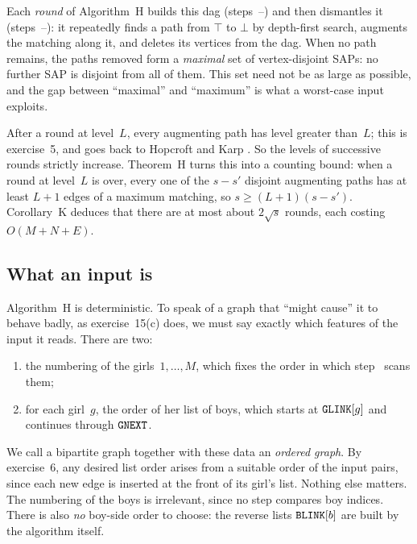 Each \emph{round} of Algorithm~H builds this dag (steps~--)
and then dismantles it (steps~--): it repeatedly finds a
path from $\top$ to $\bot$ by depth-first search, augments the matching
along it, and deletes its vertices from the dag. When no path remains,
the paths removed form a \emph{maximal} set of vertex-disjoint SAPs:
no further SAP is disjoint from all of them. This set need not be as
large as possible, and the gap between ``maximal'' and ``maximum'' is
what a worst-case input exploits.

After a round at level~$L$, every augmenting path has level greater
than~$L$; this is exercise~5, and goes back to Hopcroft and Karp
\cite[Theorem~2 and Corollaries~3--4]{HK}. So the levels of successive rounds strictly
increase. Theorem~H turns this into a
counting bound: when a round at level~$L$ is over, every one of the
$s-s'$ disjoint augmenting paths has at least $L+1$ edges of a maximum
matching, so $s\ge(L+1)(s-s')$. Corollary~K deduces that there are at
most about $2\sqrt s$ rounds, each costing $O(M+N+E)$.

\subsection{What an input is}
\label{sec:input}

Algorithm~H is deterministic. To speak of a graph that ``might cause''
it to behave badly, as exercise~15(c) does, we must say exactly which
features of the input it reads. There are two:
\begin{enumerate}[label=(\roman*)]
\item the numbering of the girls~$1,\ldots,M$, which fixes the order in
  which step~ scans them;
\item for each girl~$g$, the order of her list of boys, which starts at
  $\texttt{GLINK}[g]$ and continues through $\texttt{GNEXT}$.
\end{enumerate}
We call a bipartite graph together with these data an \emph{ordered
graph}. By exercise~6, any desired list order arises from a suitable
order of the input pairs, since each new edge is inserted at the front
of its girl's list. Nothing else matters. The numbering of the boys is
irrelevant, since no step compares boy indices. There is also \emph{no}
boy-side order to choose: the reverse lists $\texttt{BLINK}[b]$ are built by
the algorithm itself.

